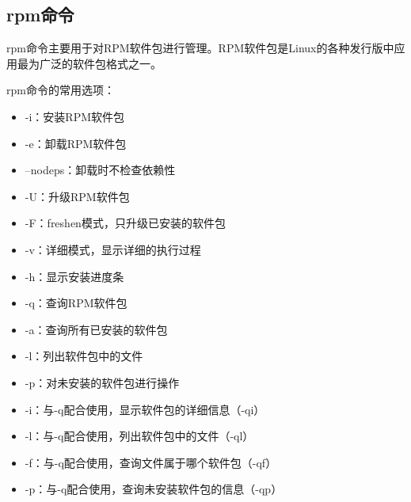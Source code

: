 \documentclass[12pt,UTF8]{ctexbook}
\begin{document}
\subsection{rpm命令}
rpm命令主要用于对RPM软件包进行管理。RPM软件包是Linux的各种发行版中应用最为广泛的软件包格式之一。

rpm命令的常用选项：
\begin{itemize}
    \item -i：安装RPM软件包
    \item -e：卸载RPM软件包
    \item --nodeps：卸载时不检查依赖性
    \item -U：升级RPM软件包
    \item -F：freshen模式，只升级已安装的软件包
    \item -v：详细模式，显示详细的执行过程
    \item -h：显示安装进度条
    \item -q：查询RPM软件包
    \item -a：查询所有已安装的软件包
    \item -l：列出软件包中的文件
    \item -p：对未安装的软件包进行操作
    \item -i：与-q配合使用，显示软件包的详细信息（-qi）
    \item -l：与-q配合使用，列出软件包中的文件（-ql）
    \item -f：与-q配合使用，查询文件属于哪个软件包（-qf）
    \item -p：与-q配合使用，查询未安装软件包的信息（-qp）
\end{itemize}
\end{document}
